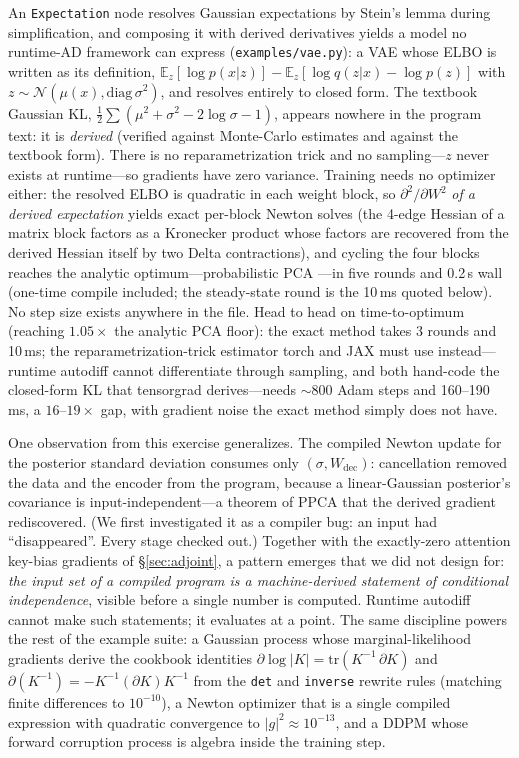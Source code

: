 \documentclass[sigplan,10pt,review]{acmart}
\begin{document}
An \texttt{Expectation} node resolves Gaussian expectations by Stein's
lemma \cite{stein1981} during simplification, and composing it with derived derivatives
yields a model no runtime-AD framework can express
(\texttt{examples/vae.py}): a VAE \cite{vae} whose ELBO is written as its
definition, $\mathbb{E}_z[\log p(x|z)] - \mathbb{E}_z[\log q(z|x) -
\log p(z)]$ with $z \sim \mathcal{N}(\mu(x), \mathrm{diag}\,\sigma^2)$,
and resolves entirely to closed form. The textbook Gaussian KL,
$\tfrac12\sum(\mu^2 + \sigma^2 - 2\log\sigma - 1)$, appears nowhere in
the program text: it is \emph{derived} (verified against Monte-Carlo
estimates and against the textbook form). There is no reparametrization
trick and no sampling---$z$ never exists at runtime---so gradients have
zero variance. Training needs no optimizer either: the resolved ELBO is
quadratic in each weight block, so $\partial^2/\partial W^2$ \emph{of a
derived expectation} yields exact per-block Newton solves (the 4-edge
Hessian of a matrix block factors as a Kronecker product whose factors
are recovered from the derived Hessian itself by two Delta
contractions), and cycling the four blocks reaches the analytic
optimum---probabilistic PCA \cite{ppca}---in five rounds and 0.2\,s wall
(one-time compile included; the steady-state round is the 10\,ms quoted
below). No step size exists anywhere in the file. Head to head on time-to-optimum (reaching
$1.05\times$ the analytic PCA floor): the exact method takes 3 rounds and
10\,ms; the reparametrization-trick estimator torch and JAX must use
instead---runtime autodiff cannot differentiate through sampling, and both
hand-code the closed-form KL that tensorgrad derives---needs ${\sim}800$
Adam \cite{adam} steps and 160--190\,ms, a $16$--$19\times$ gap, with gradient noise
the exact method simply does not have.

One observation from this exercise generalizes. The compiled Newton
update for the posterior standard deviation consumes only
$(\sigma, W_{\mathrm{dec}})$: cancellation removed the data and the
encoder from the program, because a linear-Gaussian posterior's
covariance is input-independent---a theorem of PPCA that the derived
gradient rediscovered. (We first investigated it as a compiler bug: an
input had ``disappeared''. Every stage checked out.) Together with the
exactly-zero attention key-bias gradients of \S\ref{sec:adjoint}, a
pattern emerges that we did not design for: \emph{the input set of a
compiled program is a machine-derived statement of conditional
independence}, visible before a single number is computed. Runtime
autodiff cannot make such statements; it evaluates at a point. The same
discipline powers the rest of the example suite: a Gaussian process \cite{gp}
whose marginal-likelihood gradients derive the cookbook identities \cite{matrixcookbook}
$\partial \log|K| = \mathrm{tr}(K^{-1}\,\partial K)$ and
$\partial(K^{-1}) = -K^{-1}(\partial K)K^{-1}$ from the \texttt{det} and
\texttt{inverse} rewrite rules (matching finite differences to
$10^{-10}$), a Newton optimizer that is a single compiled expression
with quadratic convergence to $|g|^2 \approx 10^{-13}$, and a DDPM \cite{ddpm} whose
forward corruption process is algebra inside the training step.
\end{document}
